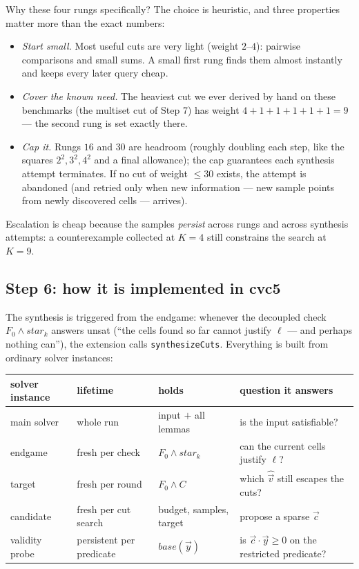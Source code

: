 \documentclass[11pt]{article}
\newcommand{\cvc}{\textsf{cvc5}\xspace}
\newcommand{\vv}{\ensuremath{\vec{v}}\xspace}
\newcommand{\vy}{\ensuremath{\vec{y}}\xspace}
\newcommand{\vc}{\ensuremath{\vec{c}}\xspace}
\begin{document}
Why these four rungs specifically? The choice is heuristic, and three
properties matter more than the exact numbers:
\begin{itemize}
\item \emph{Start small.} Most useful cuts are very light (weight
  $2$--$4$): pairwise comparisons and small sums. A small first rung
  finds them almost instantly and keeps every later query cheap.
\item \emph{Cover the known need.} The heaviest cut we ever derived by
  hand on these benchmarks (the multiset cut of Step 7) has weight
  $4 + 1 + 1 + 1 + 1 + 1 = 9$ --- the second rung is set exactly there.
\item \emph{Cap it.} Rungs $16$ and $30$ are headroom (roughly doubling
  each step, like the squares $2^2, 3^2, 4^2$ and a final allowance);
  the cap guarantees each synthesis attempt terminates. If no cut of
  weight $\le 30$ exists, the attempt is abandoned (and retried only when
  new information --- new sample points from newly discovered cells ---
  arrives).
\end{itemize}
Escalation is cheap because the samples \emph{persist} across rungs and
across synthesis attempts: a counterexample collected at $K = 4$ still
constrains the search at $K = 9$.

\subsection{Step 6: how it is implemented in \cvc}

The synthesis is triggered from the endgame: whenever the decoupled check
$F_0 \wedge \mathit{star}_k$ answers \textsf{unsat} (``the cells found so
far cannot justify $\ell$ --- and perhaps nothing can''), the extension
calls \texttt{synthesizeCuts}. Everything is built from ordinary solver
instances:

\begin{center}
\footnotesize
\begin{tabular}{lllp{4.2cm}}
\toprule
solver instance & lifetime & holds & question it answers \\
\midrule
main solver & whole run & input $+$ all lemmas & is the input satisfiable? \\
endgame & fresh per check & $F_0 \wedge \mathit{star}_k$ & can the current cells justify $\ell$? \\
target & fresh per round & $F_0 \wedge C$ & which $\hat{\vv}$ still escapes the cuts? \\
candidate & fresh per cut search & budget, samples, target & propose a sparse $\vc$ \\
validity probe & persistent per predicate & $\mathit{base}(\vy)$ & is $\vc \cdot \vy \ge 0$ on the restricted predicate? \\
\bottomrule
\end{tabular}
\end{center}
\end{document}
